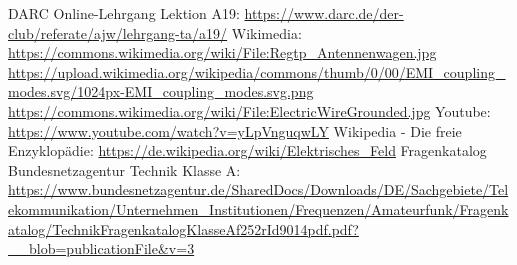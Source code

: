 \begin{thebibliography}{}
      DARC Online-Lehrgang Lektion A19:
                    \url{https://www.darc.de/der-club/referate/ajw/lehrgang-ta/a19/}
     	Wikimedia:
                    \url{https://commons.wikimedia.org/wiki/File:Regtp_Antennenwagen.jpg}
                    \url{https://upload.wikimedia.org/wikipedia/commons/thumb/0/00/EMI_coupling_modes.svg/1024px-EMI_coupling_modes.svg.png}
                    \url{https://commons.wikimedia.org/wiki/File:ElectricWireGrounded.jpg}
      Youtube:
                    \url{https://www.youtube.com/watch?v=yLpVnguqwLY}
        Wikipedia - Die freie Enzyklopädie:
                    \url{https://de.wikipedia.org/wiki/Elektrisches_Feld}
	   Fragenkatalog Bundesnetzagentur Technik Klasse A:
                    \url{https://www.bundesnetzagentur.de/SharedDocs/Downloads/DE/Sachgebiete/Telekommunikation/Unternehmen_Institutionen/Frequenzen/Amateurfunk/Fragenkatalog/TechnikFragenkatalogKlasseAf252rId9014pdf.pdf?__blob=publicationFile&v=3}
\end{thebibliography}



